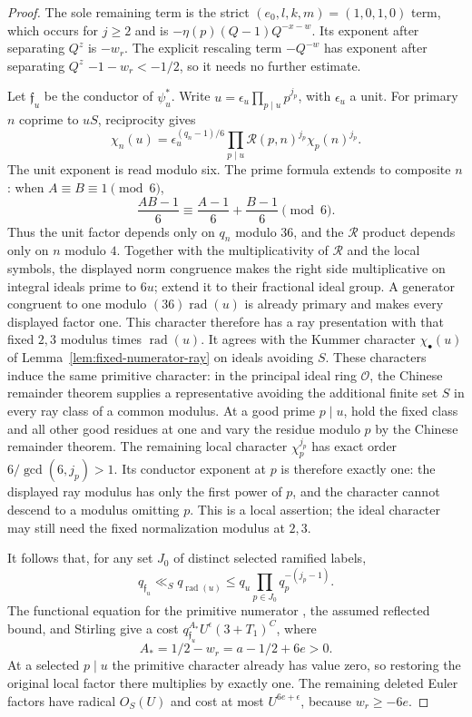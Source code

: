 \documentclass[11pt,a4paper]{article}
\numberwithin{equation}{section}
\numberwithin{figure}{section}
\theoremstyle{definition}
\theoremstyle{remark}
\begin{document}
\begin{proof}
The sole remaining term is the strict
$(e_0,l,k,m)=(1,0,1,0)$ term, which occurs for $j\ge2$ and is
$-\eta(p)(Q-1)Q^{-x-w}$.  Its exponent after separating $Q^z$ is $-w_r$.
The explicit rescaling term $-Q^{-w}$ has exponent after separating $Q^z$
$-1-w_r<-1/2$, so it needs no further estimate.

Let $\mathfrak f_u$ be the conductor of $\psi_u^*$.  Write
$u=\epsilon_u\prod_{p\mid u}p^{j_p}$, with $\epsilon_u$ a unit.
For primary $n$ coprime to $uS$, reciprocity gives
\[
 \chi_n(u)=\epsilon_u^{(q_n-1)/6}
       \prod_{p\mid u}\mathcal R(p,n)^{j_p}\chi_p(n)^{j_p}.
\]
The unit exponent is read modulo six.  The prime formula extends to
composite $n$: when $A\equiv B\equiv1\pmod6$,
\[
 \frac{AB-1}{6}\equiv\frac{A-1}{6}+\frac{B-1}{6}\pmod6.
\]
Thus the unit factor depends only on $q_n$ modulo $36$, and the
$\mathcal R$ product depends only on $n$ modulo $4$.  Together with
the multiplicativity of $\mathcal R$ and the local symbols, the
displayed norm congruence makes the right side multiplicative on
integral ideals prime to $6u$; extend it to their fractional ideal
group.  A generator congruent to one modulo
$(36)\operatorname{rad}(u)$ is already primary and makes every
displayed factor one.  This character therefore has a ray
presentation with that fixed $2,3$ modulus times
$\operatorname{rad}(u)$.  It agrees with the Kummer character
$\chi_\bullet(u)$ of Lemma~\ref{lem:fixed-numerator-ray} on ideals
avoiding $S$.  These characters induce
the same primitive character: in the principal ideal ring
$\mathcal O$, the Chinese remainder theorem supplies a representative
avoiding the additional finite set $S$ in every ray class of a
common modulus.  At a good prime
$p\mid u$, hold the fixed class and all other good residues at one
and vary the residue modulo $p$ by the Chinese remainder theorem.
The remaining local character $\chi_p^{j_p}$ has exact order
$6/\gcd(6,j_p)>1$.  Its conductor exponent at $p$ is therefore
exactly one: the displayed ray modulus has only the first power of
$p$, and the character cannot descend to a modulus omitting $p$.
This is a local assertion; the ideal character may still need the
fixed normalization modulus at $2,3$.

It follows that, for any set $J_0$ of distinct selected ramified
labels,
\begin{equation}\label{old-eq:5.13d}
 q_{\mathfrak f_u}\ll_S q_{\operatorname{rad}(u)}
       \le q_u\prod_{p\in J_0}q_p^{-(j_p-1)}.
\end{equation}
The functional equation for the primitive numerator
\cite[Equation (1.1)]{GZ}, the assumed reflected bound, and Stirling
give a cost
$q_{\mathfrak f_u}^{A_*}U^\epsilon(3+T_1)^C$, where
\[
 A_*=1/2-w_r=a-1/2+6e>0.
\]
At a selected $p\mid u$ the primitive character already has value
zero, so restoring the original local factor there multiplies by
exactly one.  The remaining deleted Euler factors have radical
$O_S(U)$ and cost at most $U^{6e+\epsilon}$, because $w_r\ge-6e$.


\end{proof}
\end{document}

